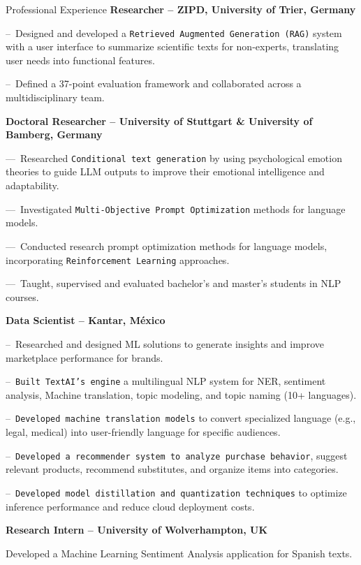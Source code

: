 \begin{rubric}{Professional Experience}
\entry*[02.2025 -- Present]%
\textbf{Researcher -- ZIPD, University of Trier, Germany}

--~Designed and developed a \texttt{Retrieved Augmented Generation (RAG)} system with a user interface to summarize scientific texts for non-experts, translating user needs into functional features.\par\par
--~Defined a 37-point evaluation framework and collaborated across a multidisciplinary team.\par\par

\entry*[04.2022 -- 01.2025]%
	\textbf{Doctoral Researcher -- University of Stuttgart \& University of Bamberg, Germany}
	
---~Researched \texttt{Conditional text generation} by using psychological emotion theories to guide LLM outputs to improve their emotional intelligence and adaptability.\par\par

 ---~Investigated \texttt{Multi-Objective Prompt Optimization} methods for language models.\par\par

 ---~Conducted research prompt optimization methods for language models, incorporating \texttt{Reinforcement Learning} approaches.\par\par
 
---~Taught, supervised and evaluated bachelor’s and master’s students in NLP courses.\par\par

\entry*[06.2018 -- 09.2021]%
	\textbf{Data Scientist -- Kantar, México}
	
	--~Researched and designed ML solutions to generate insights and improve marketplace performance for brands.\par\par
%
--~\texttt{Built TextAI’s engine} a multilingual NLP system for NER, sentiment analysis, Machine translation, topic modeling, and topic naming (10+ languages).\par

--~\texttt{Developed machine translation models} to convert specialized language (e.g., legal, medical) into user-friendly language for specific audiences.

--~\texttt{Developed a recommender system to analyze purchase behavior}, suggest relevant products, recommend substitutes, and organize items into categories.\par
--~\texttt{Developed model distillation and quantization techniques} to optimize inference performance and reduce cloud deployment costs.

%
%
\entry*[02.2017 -- 08.2017]%
	\textbf{Research Intern -- University of Wolverhampton, UK}
 
 Developed a Machine Learning Sentiment Analysis application for Spanish texts.
%
\end{rubric}